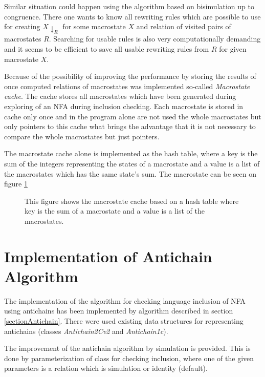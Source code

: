 Similar situation could happen using the algorithm based on bisimulation up to congruence. There one wants to know all rewriting rules which are possible to use
for creating $X{\downarrow_R}$ for some macrostate $X$ and relation of visited pairs of macrostates $R$. Searching for usable rules is also very computationally
demanding and it seems to be efficient to save all usable rewriting rules from $R$ for given macrostate $X$.

Because of the possibility of improving the performance by storing the results of once computed relations of macrostates was implemented so-called 
\emph{Macrostate cache}. The cache stores all macrostates which have been generated during exploring of an NFA during inclusion checking. Each macrostate is 
stored in cache only once and in the program alone are not used the whole macrostates but only pointers to this cache what brings the advantage that it is not
necessary to compare the whole macrostates but just pointers.

The macrostate cache alone is implemented as the hash table, where a key is the sum of the integers representing the states of a macrostate and a value is a
list of the macrostates which has the same state's sum. The macrostate can be seen on figure \ref{figMacroCache}

\begin{figure}[bt]
\begin{center}
  
  \label{figMacroCache}
  \caption{This figure shows the macrostate cache based on a hash table where key is the sum of a macrostate and a value is a list of the macrostates.}
\end{center}
\end{figure}

\section{Implementation of Antichain Algorithm}
The implementation of the algorithm for checking language inclusion of NFA using antichains has been implemented by algorithm described in section 
\ref{sectionAntichain}.  There were used existing data structures for representing antichains (classes \emph{Antichain2Cv2} and \emph{Antichain1c}). 

The improvement of the antichain algorithm by simulation is provided. This is done by parameterization of class for checking inclusion, where one of the given 
parameters is a relation which is simulation or identity (default).

